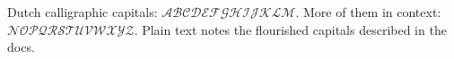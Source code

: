 \documentclass{article}
\begin{document}
Dutch calligraphic capitals: $\mathcal{ABCDEFGHIJKLM}$.
More of them in context: $\mathcal{NOPQRSTUVWXYZ}$.
Plain text notes the flourished capitals described in the docs.
\end{document}
